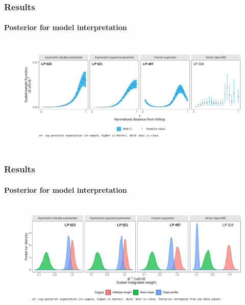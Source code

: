 \documentclass{snedecorbeamer}
\begin{document}
\begin{frame}
  \frametitle{Results}
  \framesubtitle{Posterior for model interpretation}

  \begin{figure}
    \centering
    \includegraphics[height=15em]{inc/wepp_weight_posterior_mini.pdf}
  \end{figure}

\end{frame}

\begin{frame}
  \frametitle{Results}
  \framesubtitle{Posterior for model interpretation}

  \begin{figure}
    \centering
    \includegraphics[height=15em]{inc/wepp_weight_integral_mini.pdf}
  \end{figure}

\end{frame}
\end{document}
